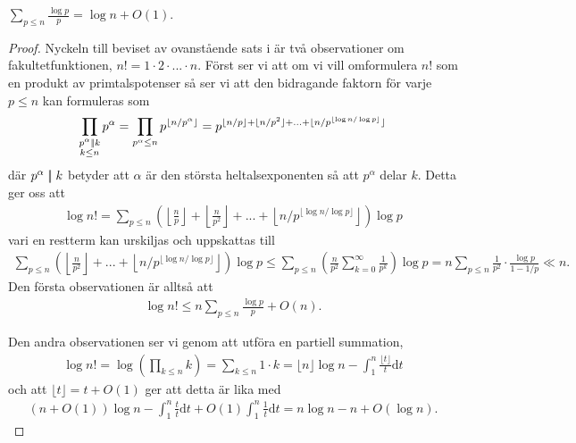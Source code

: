\cite[Sats 1.4.3]{cojocarumurty}
\begin{theorem}
    $\sum_{p \leq n} \frac{\log p}{p} = \log n + O(1) $.
\end{theorem}
\begin{proof}
Nyckeln till beviset av ovanstående sats i \cite{cojocarumurty} är två observationer om fakultetfunktionen, \(n! = 1 \cdot 2 \cdot ... \cdot n\). Först ser vi att om vi vill omformulera \(n!\) som en produkt av primtalspotenser så ser vi att den bidragande faktorn för varje $p \leq n$ kan formuleras som 
\begin{align*}
    \prod_{\substack{p^\alpha \mid\!\mid k \\ k \leq n}} p^\alpha = \prod_{p^\alpha \leq n} p^{\lfloor n/p^{\alpha} \rfloor} = p^{\lfloor n/p \rfloor + \lfloor n/p^2 \rfloor + ... + \lfloor n / p^{\lfloor \log n / \log p \rfloor} \rfloor}
\end{align*}
där \(p^\alpha \mid\!\mid k\) betyder att \(\alpha\) är den största heltalsexponenten så att $p^\alpha$ delar $k$. Detta ger oss att 
\begin{align*}
    \log n! = %
    \sum_{p \leq n} \left(\left\lfloor\frac{n}{p} \right\rfloor + \left\lfloor \frac{n}{p^2} \right\rfloor + ... + \left\lfloor n / p^{\lfloor \log n / \log p \rfloor} \right\rfloor\right) \log p
\end{align*}
vari en restterm kan urskiljas och uppskattas till
\begin{align*}
    \sum_{p \leq n} \left(\left\lfloor \frac{n}{p^2} \right\rfloor + ... + \left\lfloor n / p^{\lfloor \log n / \log p \rfloor} \right\rfloor\right) \log p \leq
    \sum_{p \leq n} \left( \frac{n}{p^2}  \sum_{k=0}^\infty \frac{1}{p^k} \right) \log p
    = n \sum_{p \leq n} \frac{1}{p^2} \cdot \frac{\log p}{1 - 1/p} \ll n.
\end{align*} %
Den första observationen är alltså att
\begin{align}
    \log n! \leq n \sum_{p \leq n} \frac{\log p}{p} + O(n).
\end{align}

Den andra observationen ser vi genom att utföra en partiell summation,
\begin{align*}
    \log n! = \log \left(\prod_{k \leq n} k\right) = \sum_{k \leq n} 1 \cdot k = 
    \lfloor n \rfloor \log n - \int_1^n \frac{\lfloor t \rfloor}{t} \text{d} t 
\end{align*}
och att \(\lfloor t \rfloor = t + O(1)\) ger att detta är lika med
\begin{align}
    (n + O(1)) \log n - \int_1^n \frac{t}{t} \text{d} t + O(1) \int_1^n \frac{1}{t} \text{d} t  = n \log n - n + O(\log n).
\end{align}

\end{proof}